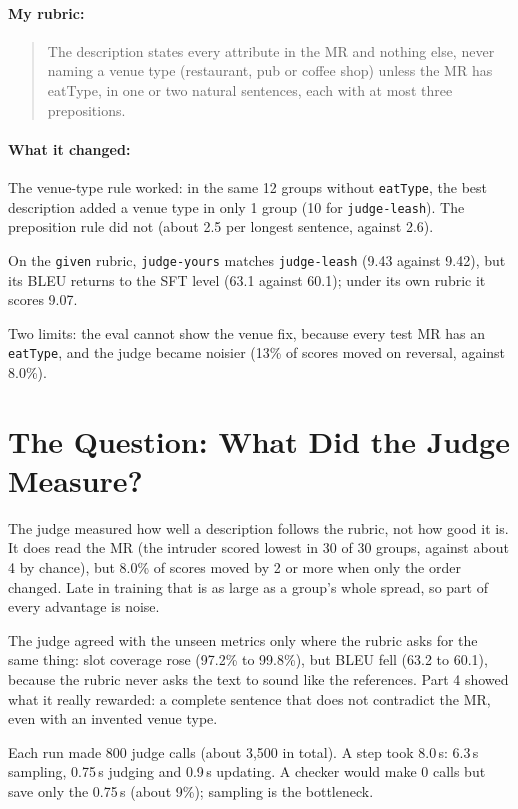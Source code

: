 \documentclass[10pt]{article}
\begin{document}
\paragraph{My rubric:}
\begin{quote}
The description states every attribute in the MR and nothing else,
never naming a venue type (restaurant, pub or coffee shop) unless the MR
has eatType, in one or two natural sentences, each with at most three
prepositions.
\end{quote}

\paragraph{What it changed:}
The venue-type rule worked: in the same 12 groups without
\texttt{eatType}, the best description added a venue type in only 1
group (10 for \texttt{judge-leash}).
The preposition rule did not (about 2.5 per longest sentence, against
2.6).

On the \texttt{given} rubric, \texttt{judge-yours} matches
\texttt{judge-leash} (9.43 against 9.42), but its BLEU returns to the SFT
level (63.1 against 60.1); under its own rubric it scores 9.07.

Two limits: the eval cannot show the venue fix, because every test MR has
an \texttt{eatType}, and the judge became noisier (13\% of scores moved on
reversal, against 8.0\%).

\section*{The Question: What Did the Judge Measure?}

The judge measured how well a description follows the rubric, not how
good it is. It does read the MR (the intruder scored lowest in 30 of 30
groups, against about 4 by chance), but 8.0\% of scores moved by 2 or
more when only the order changed. Late in training that is as large as a
group's whole spread, so part of every advantage is noise.

The judge agreed with the unseen metrics only where the rubric asks for
the same thing: slot coverage rose (97.2\% to 99.8\%), but BLEU fell (63.2
to 60.1), because the rubric never asks the text to sound like the
references. Part 4 showed what it really rewarded: a complete sentence
that does not contradict the MR, even with an invented venue type.

Each run made 800 judge calls (about 3{,}500 in total). A step took
8.0\,s: 6.3\,s sampling, 0.75\,s judging and 0.9\,s updating. A checker
would make 0 calls but save only the 0.75\,s (about 9\%); sampling is the
bottleneck.
\end{document}
